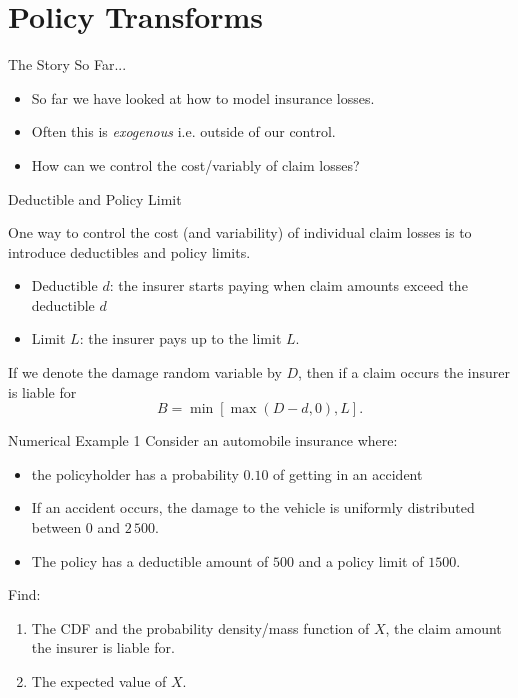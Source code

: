 \documentclass[11pt]{beamer}
\begin{document}
\section{Policy Transforms }
\begin{frame}{The Story So Far...} 

\begin{itemize}

\item So far we have looked at how to model insurance losses.

\vfill

\item Often this is \textit{exogenous} i.e. outside of our control.

\vfill

\item How can we control the cost/variably of claim losses?

\end{itemize}
  
\end{frame}
\begin{frame}{Deductible and Policy Limit}

  One way to control the cost (and variability) of individual claim losses is to introduce deductibles and policy limits.
  \vfill
  \begin{itemize}
  \item \alert{Deductible $d$}: the insurer starts paying when claim amounts exceed the deductible $d$
  \vfill
  \item \alert{Limit $L$}: the insurer pays up to the limit $L$.
  \end{itemize}
  \vfill
  If we denote the damage random variable by $D$, then if a claim occurs the insurer is liable for
  \begin{equation*}
    B=\min \left[ \max \left( D-d,0\right) ,L\right] \text{.}
  \end{equation*}
  
\end{frame}
\begin{frame}{Numerical Example 1}
  Consider an automobile insurance where:
  \begin{itemize}
  \item the policyholder has a probability $0.10$ of getting in an accident
  \item If an accident occurs, the damage to the vehicle is uniformly distributed between $0$ and $2\,500$.
  \item The policy has a deductible amount of $500$ and a policy limit of $1500$.
  \end{itemize}
  \vfill  
  
  Find:
  \begin{enumerate}
  \item The CDF and the probability density/mass function of $X$, the claim amount the insurer is liable for.
  \item The expected value of $X$.
  \end{enumerate}
\end{frame}
\end{document}

